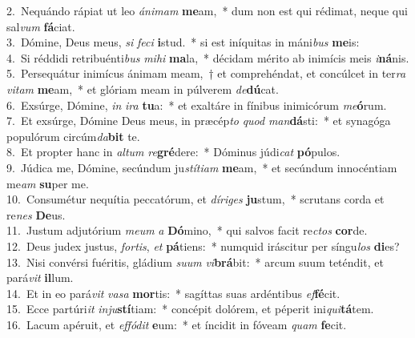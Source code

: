 {2.~}Nequándo rápiat ut leo \textit{á}\textit{ni}\textit{mam} \textbf{me}am,~* dum non est qui rédimat, neque qui sal\textit{vum} \textbf{fá}ciat.\\
{3.~}Dómine, Deus meus, \textit{si} \textit{fe}\textit{ci} \textbf{i}stud.~* si est iníquitas in máni\textit{bus} \textbf{me}is:\\
{4.~}Si réddidi retribuénti\textit{bus} \textit{mi}\textit{hi} \textbf{ma}la,~* décidam mérito ab inimícis meis \textit{i}\textbf{ná}nis.\\
{5.~}Persequátur inimícus ánimam meam,~† et comprehéndat, et concúlcet in ter\textit{ra} \textit{vi}\textit{tam} \textbf{me}am,~* et glóriam meam in púlverem \textit{de}\textbf{dú}cat.\\
{6.~}Exsúrge, Dómine, \textit{in} \textit{i}\textit{ra} \textbf{tu}a:~* et exaltáre in fínibus inimicórum \textit{me}\textbf{ó}rum.\\
{7.~}Et exsúrge, Dómine Deus meus, in præcép\textit{to} \textit{quod} \textit{man}\textbf{dá}sti:~* et synagóga populórum circúm\textit{da}\textbf{bit} te.\\
{8.~}Et propter hanc in \textit{al}\textit{tum} \textit{re}\textbf{gré}dere:~* Dóminus júdi\textit{cat} \textbf{pó}pulos.\\
{9.~}Júdica me, Dómine, secúndum ju\textit{stí}\textit{ti}\textit{am} \textbf{me}am,~* et secúndum innocéntiam me\textit{am} \textbf{su}per me.\\
{10.~}Consumétur nequítia peccatórum, et \textit{dí}\textit{ri}\textit{ges} \textbf{ju}stum,~* scrutans corda et re\textit{nes} \textbf{De}us.\\
{11.~}Justum adjutórium \textit{me}\textit{um} \textit{a} \textbf{Dó}mino,~* qui salvos facit re\textit{ctos} \textbf{cor}de.\\
{12.~}Deus judex justus, \textit{for}\textit{tis}, \textit{et} \textbf{pá}tiens:~* numquid iráscitur per síngu\textit{los} \textbf{di}es?\\
{13.~}Nisi convérsi fuéritis, gládium \textit{su}\textit{um} \textit{vi}\textbf{brá}bit:~* arcum suum teténdit, et pará\textit{vit} \textbf{il}lum.\\
{14.~}Et in eo pará\textit{vit} \textit{va}\textit{sa} \textbf{mor}tis:~* sagíttas suas ardéntibus \textit{ef}\textbf{fé}cit.\\
{15.~}Ecce partúri\textit{it} \textit{in}\textit{ju}\textbf{stí}tiam:~* concépit dolórem, et péperit ini\textit{qui}\textbf{tá}tem.\\
{16.~}Lacum apéruit, et \textit{ef}\textit{fó}\textit{dit} \textbf{e}um:~* et íncidit in fóveam \textit{quam} \textbf{fe}cit.\\
